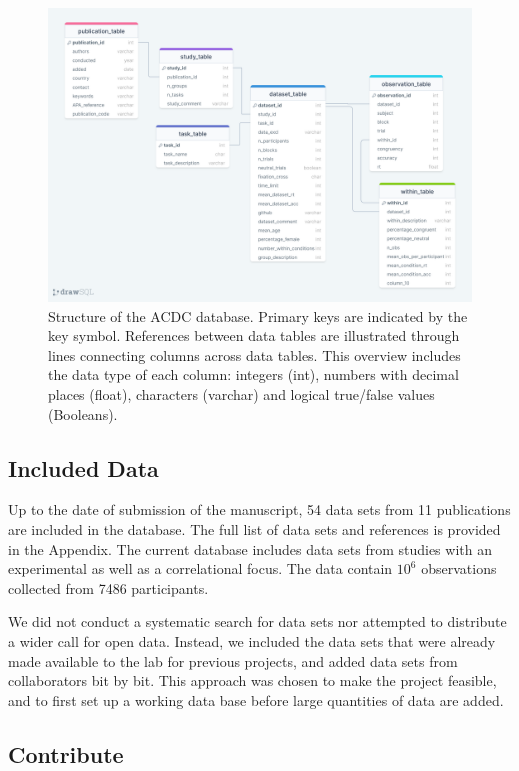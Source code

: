 \documentclass[
  man,floatsintext]{apa6}
\begin{document}
\begin{figure}
\centering
\includegraphics{images/db_structure.png}
\caption{\label{fig:figure2}Structure of the ACDC database. Primary keys are indicated by the key symbol. References between data tables are illustrated through lines connecting columns across data tables. This overview includes the data type of each column: integers (int), numbers with decimal places (float), characters (varchar) and logical true/false values (Booleans).}
\end{figure}

\hypertarget{included-data}{%
\subsection{Included Data}\label{included-data}}

Up to the date of submission of the manuscript, 54 data sets from 11 publications are included in the database. The full list of data sets and references is provided in the Appendix. The current database includes data sets from studies with an experimental as well as a correlational focus. The data contain \(10^ 6\) observations collected from 7486 participants.

We did not conduct a systematic search for data sets nor attempted to distribute a wider call for open data. Instead, we included the data sets that were already made available to the lab for previous projects, and added data sets from collaborators bit by bit. This approach was chosen to make the project feasible, and to first set up a working data base before large quantities of data are added.

\hypertarget{contribute}{%
\subsection{Contribute}\label{contribute}}
\end{document}
